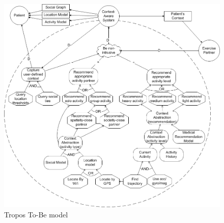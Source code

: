 \documentclass[9pt,letterpaper]{article}
\begin{document}
\begin{figure}
\centerline{\includegraphics[scale=.51]{soc-r1-srgainey-to-be.png}}
\caption{Tropos To-Be model}
\label{fig:two}
\end{figure}


\begin{singlespace}
\begin{footnotesize}

\end{footnotesize}
\end{singlespace}
\end{document}

